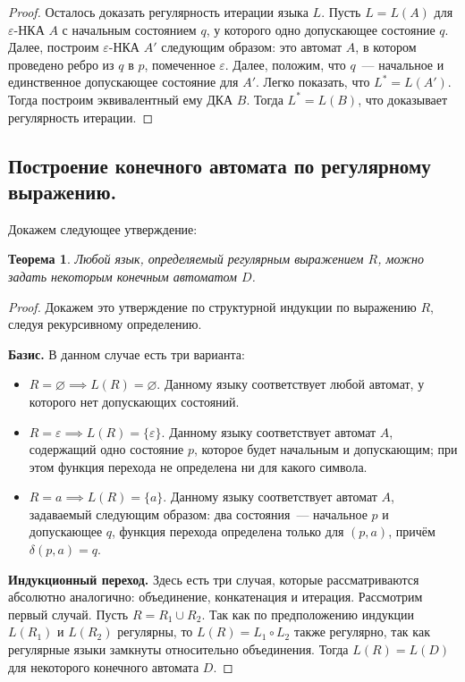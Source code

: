 \documentclass[a4paper,12pt]{article}
\newtheorem*{theorem}{Теорема}
\begin{document}
\begin{proof}
		Осталось доказать регулярность итерации языка \(L\). Пусть \(L = L(A)\) для \(\varepsilon\)-НКА \(A\) с начальным состоянием \(q\), у которого одно допускающее состояние \(q\). Далее, построим \(\varepsilon\)-НКА \(A'\) следующим образом: это автомат \(A\), в котором проведено ребро из \(q\) в \(p\), помеченное \(\varepsilon\). Далее, положим, что \(q\)~--- начальное и единственное допускающее состояние для \(A'\). Легко показать, что \(L^* = L(A')\). Тогда построим эквивалентный ему ДКА \(B\). Тогда \(L^* = L(B)\), что доказывает регулярность итерации.  
	\end{proof}
	
	\subsection{Построение конечного автомата по регулярному выражению.}
	Докажем следующее утверждение:
	\begin{theorem}
		Любой язык, определяемый регулярным выражением \(R\), можно задать некоторым конечным автоматом \(D\).
	\end{theorem}
	\begin{proof}
		Докажем это утверждение по структурной индукции по выражению \(R\), следуя рекурсивному определению.
		
		\textbf{Базис.} В данном случае есть три варианта:
		\begin{itemize}
			\item \(R = \varnothing \implies L(R) = \varnothing\). Данному языку соответствует любой автомат, у которого нет допускающих состояний.
			
			\item \(R = \varepsilon \implies L(R) = \{\varepsilon\}\). Данному языку соответствует автомат \(A\), содержащий одно состояние \(p\), которое будет начальным и допускающим; при этом функция перехода не определена ни для какого символа.
			
			\item \(R = a \implies L(R) = \{a\}\). Данному языку соответствует автомат \(A\), задаваемый следующим образом: два состояния~--- начальное \(p\) и допускающее \(q\), функция перехода определена только для \((p, a)\), причём \(\delta(p, a) = q\).
		\end{itemize}
		
		\textbf{Индукционный переход.} Здесь есть три случая, которые рассматриваются абсолютно аналогично: объединение, конкатенация и итерация. Рассмотрим первый случай. Пусть \(R = R_1 \cup R_2\). Так как по предположению индукции \(L(R_1)\) и \(L(R_2)\) регулярны, то \(L(R) = L_1 \circ L_2\) также регулярно, так как регулярные языки замкнуты относительно объединения. Тогда \(L(R) = L(D)\) для некоторого конечного автомата \(D\).
	\end{proof}
\newpage
\end{document}

